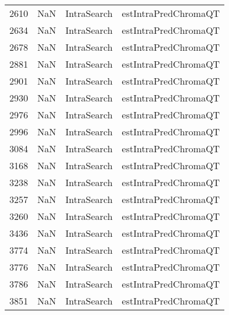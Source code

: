 \begin{tabular}{llll}
2610 &                   NaN &                IntraSearch &                      estIntraPredChromaQT \\
2634 &                   NaN &                IntraSearch &                      estIntraPredChromaQT \\
2678 &                   NaN &                IntraSearch &                      estIntraPredChromaQT \\
2881 &                   NaN &                IntraSearch &                      estIntraPredChromaQT \\
2901 &                   NaN &                IntraSearch &                      estIntraPredChromaQT \\
2930 &                   NaN &                IntraSearch &                      estIntraPredChromaQT \\
2976 &                   NaN &                IntraSearch &                      estIntraPredChromaQT \\
2996 &                   NaN &                IntraSearch &                      estIntraPredChromaQT \\
3084 &                   NaN &                IntraSearch &                      estIntraPredChromaQT \\
3168 &                   NaN &                IntraSearch &                      estIntraPredChromaQT \\
3238 &                   NaN &                IntraSearch &                      estIntraPredChromaQT \\
3257 &                   NaN &                IntraSearch &                      estIntraPredChromaQT \\
3260 &                   NaN &                IntraSearch &                      estIntraPredChromaQT \\
3436 &                   NaN &                IntraSearch &                      estIntraPredChromaQT \\
3774 &                   NaN &                IntraSearch &                      estIntraPredChromaQT \\
3776 &                   NaN &                IntraSearch &                      estIntraPredChromaQT \\
3786 &                   NaN &                IntraSearch &                      estIntraPredChromaQT \\
3851 &                   NaN &                IntraSearch &                      estIntraPredChromaQT \\

\end{tabular}
